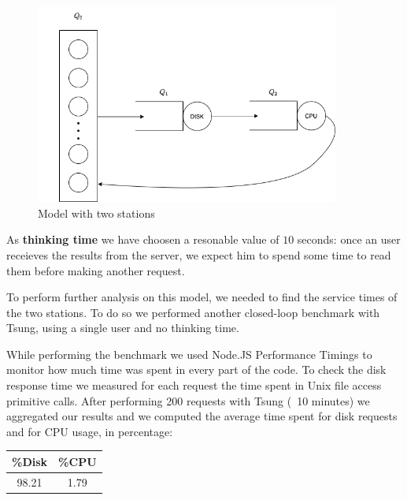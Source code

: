 \documentclass[11pt]{scrartcl} %
\begin{document}
\begin{figure}[h]
\includegraphics[width=10cm]{Images/img2.png}
\centering
\caption{Model with two stations}
\label{fig:img2}
\end{figure}

As \textbf{thinking time} we have choosen a resonable value of $10$ seconds: once an user receieves the results from the server, we expect him to spend some time to read them before making another request.

To perform further analysis on this model, we needed to find the service times of the two stations. To do so we performed another closed-loop benchmark with Tsung, using a single user and no thinking time.


While performing the benchmark we used Node.JS Performance Timings to monitor how much time was spent in every part of the code. To check the disk response time we measured for each request the time spent in Unix file access primitive calls. After performing 200 requests with Tsung (~10 minutes) we aggregated our results and we computed the average time spent for disk requests and for CPU usage, in percentage:

\begin{table}[H]
\centering
\begin{tabular}{c|c}
\multicolumn{1}{l|}{\%Disk} & \multicolumn{1}{l}{\%CPU} \\ \hline
98.21	& 1.79\\
\end{tabular}
\end{table}
\end{document}
